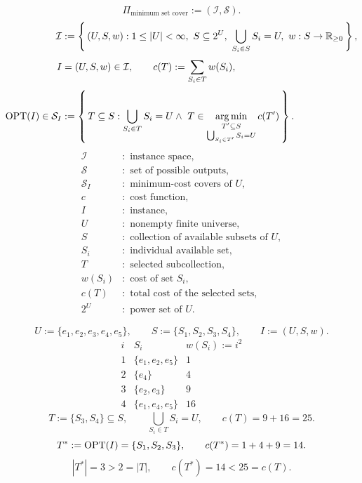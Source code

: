 \documentclass[12pt,a4paper]{article}
\begin{document}
\noindent\begin{minipage}{\linewidth}
\begin{definition}
\[
\Pi_{\text{minimum set cover}}:=(\mathcal I,\mathcal S).
\]
\[
\begin{aligned}
\mathcal I&:=\left\{\,(U,S,w):
1\leq|U|<\infty,\ S\subseteq 2^U,\
\bigcup_{S_i\in S}S_i=U,\ w:S\to\mathbb R_{\geq 0}\,\right\},\\[3pt]
I&=(U,S,w)\in\mathcal I,\qquad c(T):=\sum_{S_i\in T}w(S_i),\\[3pt]
\operatorname{OPT}(I)\in\mathcal S_I&:=\left\{\,T\subseteq S:
\displaystyle\bigcup_{S_i\in T}S_i=U
\land\ T\in\operatorname*{arg\,min}_{\substack{T'\subseteq S\\\bigcup_{S_i\in T'}S_i=U}}c(T')
\,\right\}.
\end{aligned}
\]
\[
\begin{aligned}
\mathcal I&:\text{ instance space},\\
\mathcal S&:\text{ set of possible outputs},\\
\mathcal S_I&:\text{ minimum-cost covers of }U,\\
c&:\text{ cost function},\\
I&:\text{ instance},\\
U&:\text{ nonempty finite universe},\\
S&:\text{ collection of available subsets of }U,\\
S_i&:\text{ individual available set},\\
T&:\text{ selected subcollection},\\
w(S_i)&:\text{ cost of set }S_i,\\
c(T)&:\text{ total cost of the selected sets},\\
2^U&:\text{ power set of }U.
\end{aligned}
\]
\end{definition}
\end{minipage}\par

\noindent\begin{minipage}{\linewidth}
\begin{example}
\[
U:=\{e_1,e_2,e_3,e_4,e_5\},
\qquad S:=\{S_1,S_2,S_3,S_4\},
\qquad I:=(U,S,w).
\]
\[
\begin{array}{c|c|c}
i & S_i & w(S_i):=i^2\\ \hline
1 & \{e_1,e_2,e_5\} & 1\\
2 & \{e_4\} & 4\\
3 & \{e_2,e_3\} & 9\\
4 & \{e_1,e_4,e_5\} & 16
\end{array}
\]
\[
T:=\{S_3,S_4\}\subseteq S,\qquad\bigcup_{S_i\in T}S_i=U,
\qquad c(T)=9+16=25.
\]
\[
T^*:=\operatorname{OPT}(I)=\{S_1,S_2,S_3\},
\qquad c(T^*)=1+4+9=14.
\]
\[
|T^*|=3>2=|T|,
\qquad c(T^*)=14<25=c(T).
\]
\end{example}
\end{minipage}\par
\end{document}
